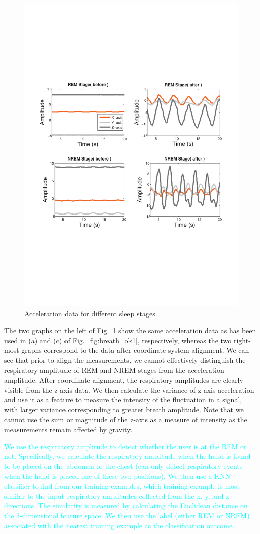  \begin{figure}[!t]
\centering
      \includegraphics[width=0.75\linewidth]{Figures/cordi.pdf}
  \caption{Acceleration data for different sleep stages.}\label{fig:cordi}
\end{figure}

The two graphs on the left of Fig.~\ref{fig:cordi} show the same acceleration data as has been used in (a) and (c) of
Fig.~\ref{fig:breath_ok1}, respectively, whereas the two right-most graphs correspond to the data after coordinate system alignment.  We
can see that prior to align the measurements, we cannot effectively distinguish the respiratory amplitude of REM and NREM stages from the
acceleration amplitude. After coordinate alignment, the respiratory amplitudes are clearly visible from the z-axis data. We then calculate
the variance of z-axis acceleration and use it as a feature to measure the intensity of the fluctuation in a signal, with larger variance
corresponding to greater breath amplitude. Note that we cannot use the sum or magnitude of the z-axis as a measure of intensity as the
measurements remain affected by gravity.

\textcolor{cyan}{ We use the respiratory amplitude to detect whether the user is at the REM or not. Specifically, we calculate the
respiratory amplitude when the hand is found to be placed on the abdomen or the chest (\systemname can only detect respiratory events when
the hand is placed one of these two positions). We then use a KNN classifier to find from our training examples, which training example is
most similar to the input respiratory amplitudes collected from the x, y, and z directions. The similarity is measured by calculating the
Euclidean distance on the 3-dimensional feature space. We then use the label (either REM or NREM) associated with the nearest training
example as the classification outcome.}

